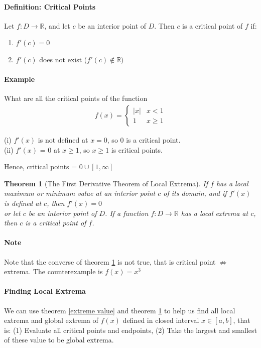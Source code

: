 \documentclass[12pt]{article}
\newtheorem{theorem}{Theorem}
\begin{document}
\paragraph{Definition:  Critical Points}
Let $f : D \to \mathbb{R}$, and let $c$ be an interior point of $D$. Then $c$ is a critical point of $f$ if:
\begin{enumerate}[i]
    \item $f'(c) = 0$ 
    \item $f'(c)$ does not exist ($f'(c) \notin \mathbb{R})$
\end{enumerate}

\paragraph{Example} What are all the critical points of the function 
\begin{align*} 
    f(x) = 
    \begin{cases} 
        |x| & x <  1 \\
        1 & x \geq 1
    \end{cases}
\end{align*}

\noindent
(i) $f'(x)$ is not defined at $x = 0$, so 0 is a critical point. \\
(ii) $f'(x)$ = 0 at $x \geq 1$, so $x \geq 1$ is critical points. 

\noindent
Hence, critical points = ${0} \cup [1, \infty]$

\begin{theorem}[The First Derivative Theorem of Local Extrema]
    If $f$ has a local maximum or minimum value at an interior point $c$ of its domain,
    and if $f'(x)$ is defined at $c$, then $f'(x) = 0$ \\

    \noindent
    or let $c$ be an interior point of $D$. If a function $f : D \to \mathbb{R}$ has a local extrema
    at $c$, then $c$ is a critical point of $f$.
    \label{local extrema}
\end{theorem}

\paragraph{Note} Note that the converse of theorem \ref{local extrema} is not true, that is critical point $\nRightarrow$ extrema. The counterexample
is $f(x) = x^3$

\paragraph{Finding Local Extrema}
We can use theorem \ref{extreme value} and theorem \ref{local extrema} to help us find all local extrema and global extrema of $f(x)$ defined in closed interval $x \in [a, b]$, that is:
(1) Evaluate all critical points and endpoints, (2) Take the largest and smallest of these value to be global extrema.
\end{document}

